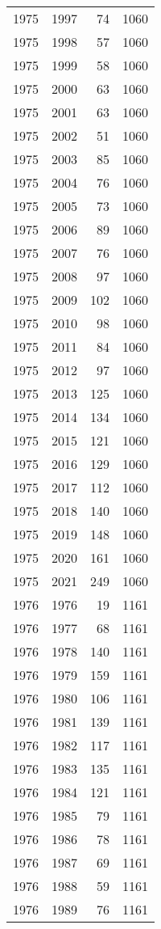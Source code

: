 \documentclass[
  11pt,
  letterpaper,
  DIV=11,
  numbers=noendperiod,
  twoside]{scrartcl}
\begin{document}
\begin{longtable}[]{@{}rrrr@{}}
1975 & 1997 & 74 & 1060 \\
1975 & 1998 & 57 & 1060 \\
1975 & 1999 & 58 & 1060 \\
1975 & 2000 & 63 & 1060 \\
1975 & 2001 & 63 & 1060 \\
1975 & 2002 & 51 & 1060 \\
1975 & 2003 & 85 & 1060 \\
1975 & 2004 & 76 & 1060 \\
1975 & 2005 & 73 & 1060 \\
1975 & 2006 & 89 & 1060 \\
1975 & 2007 & 76 & 1060 \\
1975 & 2008 & 97 & 1060 \\
1975 & 2009 & 102 & 1060 \\
1975 & 2010 & 98 & 1060 \\
1975 & 2011 & 84 & 1060 \\
1975 & 2012 & 97 & 1060 \\
1975 & 2013 & 125 & 1060 \\
1975 & 2014 & 134 & 1060 \\
1975 & 2015 & 121 & 1060 \\
1975 & 2016 & 129 & 1060 \\
1975 & 2017 & 112 & 1060 \\
1975 & 2018 & 140 & 1060 \\
1975 & 2019 & 148 & 1060 \\
1975 & 2020 & 161 & 1060 \\
1975 & 2021 & 249 & 1060 \\
1976 & 1976 & 19 & 1161 \\
1976 & 1977 & 68 & 1161 \\
1976 & 1978 & 140 & 1161 \\
1976 & 1979 & 159 & 1161 \\
1976 & 1980 & 106 & 1161 \\
1976 & 1981 & 139 & 1161 \\
1976 & 1982 & 117 & 1161 \\
1976 & 1983 & 135 & 1161 \\
1976 & 1984 & 121 & 1161 \\
1976 & 1985 & 79 & 1161 \\
1976 & 1986 & 78 & 1161 \\
1976 & 1987 & 69 & 1161 \\
1976 & 1988 & 59 & 1161 \\
1976 & 1989 & 76 & 1161 \\

\end{longtable}
\end{document}
